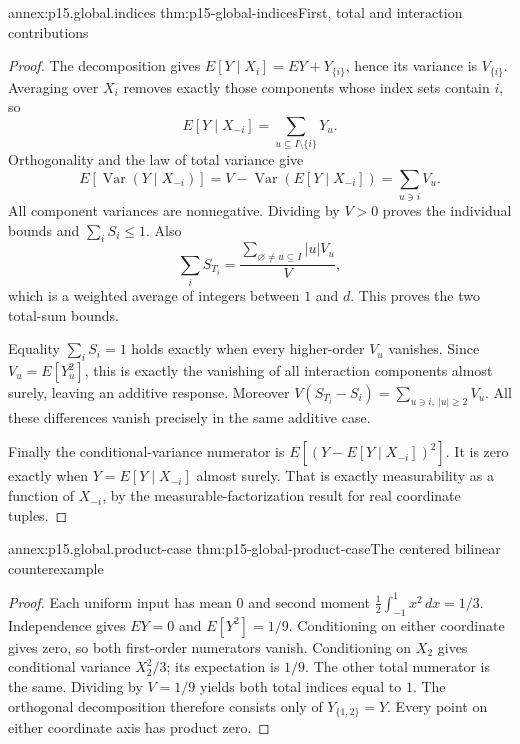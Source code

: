 \begin{annexitem}{annex:p15.global.indices}
 {thm:p15-global-indices}{First, total and interaction contributions}
\begin{proof}
The decomposition gives
\(E[Y\mid X_i]=EY+Y_{\{i\}}\), hence its variance is \(V_{\{i\}}\).
Averaging over \(X_i\) removes exactly those components whose index sets
contain \(i\), so
\[
 E[Y\mid X_{-i}]=\sum_{u\subseteq I\setminus\{i\}}Y_u.
\]
Orthogonality and the law of total variance give
\[
 E[\operatorname{Var}(Y\mid X_{-i})]
    =V-\operatorname{Var}(E[Y\mid X_{-i}])
    =\sum_{u\ni i}V_u.
\]
All component variances are nonnegative. Dividing by \(V>0\) proves
the individual bounds and \(\sum_iS_i\leq1\). Also
\[
 \sum_iS_{T_i}=\frac{\sum_{\varnothing\ne u\subseteq I}|u|V_u}{V},
\]
which is a weighted average of integers between \(1\) and \(d\).
This proves the two total-sum bounds.

Equality \(\sum_iS_i=1\) holds exactly when every higher-order \(V_u\)
vanishes. Since \(V_u=E[Y_u^2]\), this is exactly the vanishing of all
interaction components almost surely, leaving an additive response.
Moreover
\(V(S_{T_i}-S_i)=\sum_{u\ni i,\ |u|\geq2}V_u\).
All these differences vanish precisely in the same additive case.

Finally the conditional-variance numerator is
\(E[(Y-E[Y\mid X_{-i}])^2]\).
It is zero exactly when \(Y=E[Y\mid X_{-i}]\) almost surely.
That is exactly measurability as a function of \(X_{-i}\), by the
measurable-factorization result for real coordinate tuples.
\end{proof}
\end{annexitem}

\begin{annexitem}{annex:p15.global.product-case}
 {thm:p15-global-product-case}{The centered bilinear counterexample}
\begin{proof}
Each uniform input has mean \(0\) and second moment
\(\frac12\int_{-1}^1x^2\,dx=1/3\).
Independence gives \(EY=0\) and \(E[Y^2]=1/9\).
Conditioning on either coordinate gives zero, so both first-order
numerators vanish. Conditioning on \(X_2\) gives conditional variance
\(X_2^2/3\); its expectation is \(1/9\).
The other total numerator is the same. Dividing by \(V=1/9\) yields
both total indices equal to \(1\).
The orthogonal decomposition therefore consists only of \(Y_{\{1,2\}}=Y\).
Every point on either coordinate axis has product zero.
\end{proof}
\end{annexitem}

